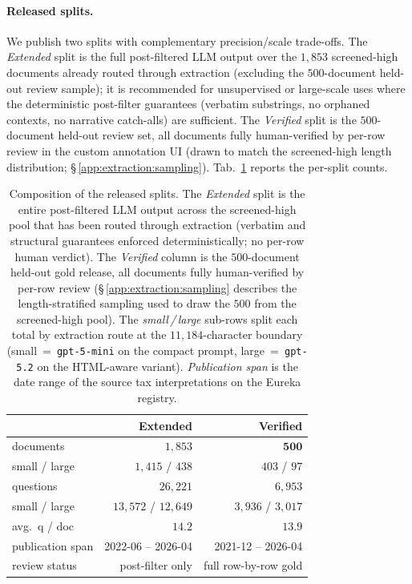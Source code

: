 \paragraph{Released splits.}
We publish two splits with complementary precision/scale trade-offs.
The \emph{Extended} split is the full post-filtered LLM output over
the $1{,}853$ screened-high documents already routed through
extraction (excluding the $500$-document held-out review sample); it
is recommended for unsupervised or large-scale uses where the
deterministic post-filter guarantees (verbatim substrings, no
orphaned contexts, no narrative catch-alls) are sufficient. The
\emph{Verified} split is the $500$-document held-out review set, all
documents fully human-verified by per-row review in the custom
annotation UI (drawn to match the screened-high length distribution;
\S\,\ref{app:extraction:sampling}). Tab.~\ref{tab:dataset-splits}
reports the per-split counts.

\begin{table}[!htb]
\centering
\footnotesize
\begin{tabular}{@{}lrr@{}}
\toprule
 & \textbf{Extended} & \textbf{Verified} \\
\midrule
documents               & $1{,}853$             & $\mathbf{500}$ \\
\quad small / large     & $1{,}415$ / $438$       & $403$ / $97$ \\
questions               & $26{,}221$            & $6{,}953$ \\
\quad small / large     & $13{,}572$ / $12{,}649$ & $3{,}936$ / $3{,}017$ \\
avg.\ q / doc           & $14.2$                & $13.9$ \\
publication span        & 2022-06 -- 2026-04  & 2021-12 -- 2026-04 \\
review status           & post-filter only    & full row-by-row gold \\
\bottomrule
\end{tabular}
\caption{Composition of the released splits. The \emph{Extended}
split is the entire post-filtered LLM output across the
screened-high pool that has been routed through extraction (verbatim
and structural guarantees enforced deterministically; no per-row
human verdict). The \emph{Verified} column is the $500$-document
held-out gold release, all documents fully human-verified by per-row
review (\S\,\ref{app:extraction:sampling} describes the
length-stratified sampling used to draw the $500$ from the
screened-high pool). The \emph{small\,/\,large} sub-rows split each
total by extraction route at the $11{,}184$-character boundary
(small~=~\texttt{gpt-5-mini} on the compact prompt,
large~=~\texttt{gpt-5.2} on the HTML-aware variant).
\emph{Publication span} is the date range of the source tax
interpretations on the Eureka registry.}
\label{tab:dataset-splits}
\end{table}

